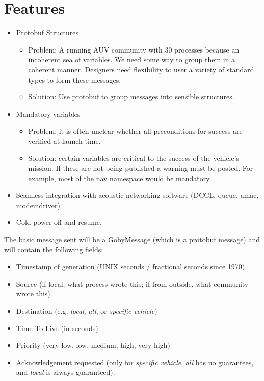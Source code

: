 \documentclass[10pt,letterpaper]{article}
\begin{document}
\section{Features}

\begin{itemize}
\item Protobuf Structures
\begin{itemize}
\item Problem: A running AUV community with 30 processes because an incoherent sea of variables. We need some way to group them in a coherent manner. Designers need flexibility to user a variety of standard types to form these messages.
\item Solution: Use protobuf to group messages into sensible structures.
\end{itemize}
\item Mandatory variables
\begin{itemize}
\item Problem: it is often unclear whether all preconditions for success are verified at launch time.
\item Solution: certain variables are critical to the success of the vehicle's mission. If these are not being published a warning must be posted. For example, most of the nav namespace would be mandatory.
\end{itemize}
\item Seamless integration with acoustic networking software (DCCL, queue, amac, modemdriver)
\item Cold power off and resume.
\end{itemize}

The basic message sent will be a GobyMessage (which is a protobuf message) and will contain the following fields:
\begin{itemize}
\item Timestamp of generation (UNIX seconds / fractional seconds since 1970)
\item Source (if local, what process wrote this; if from outside, what community wrote this).
\item Destination (e.g. \textit{local}, \textit{all}, or \textit{specific vehicle})
\item Time To Live (in seconds)
\item Priority (very low, low, medium, high, very high)
\item Acknowledgement requested (only for \textit{specific vehicle}, \textit{all} has no guarantees, and \textit{local} is always guaranteed).
\end{itemize}
\end{document}
